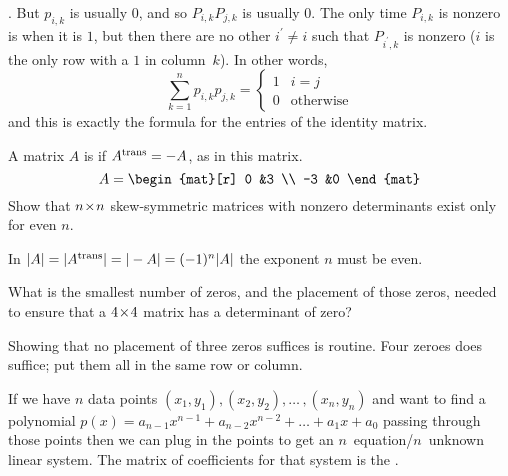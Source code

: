 \begin{exercises}
\begin{answer}
      \).
      But $p_{i,k}$ is usually $0$, and so $P_{i,k}P_{j,k}$ is usually $0$. 
      The only time $P_{i,k}$ is nonzero is when it is $1$, 
      but then there are no other $i^\prime\neq i$ such that $P_{i^\prime,k}$ 
      is nonzero ($i$ is the only row with a $1$ in column~$k$). 
      In other words,
      \begin{equation*}
        \sum_{k=1}^n p_{i,k}p_{j,k}=
        \begin{cases}
          1  &i=j  \\
          0  &\text{otherwise}
        \end{cases}
      \end{equation*}
      and this is exactly the formula for the entries of the identity matrix.
    \end{answer}
  \item 
    A matrix \( A \) is 
     if \( {{A}^{\rm trans}}=-A \),
    as in this matrix.
    \begin{equation*}
      A=\begin{mat}[r]
          0  &3  \\
         -3  &0
        \end{mat}
    \end{equation*}
    Show that \( n \! \times \! n \) skew-symmetric matrices with nonzero
    determinants exist only for even \( n \).
    \begin{answer}
      In 
      \( \deter{A}=\deter{\trans{A}}=\deter{-A}=(-1)^n\deter{A} \)
      the exponent $n$ must be even. 
    \end{answer}
  \recommended \item
    What is the smallest number of zeros, and the placement of
    those zeros, needed to ensure that a \( 4 \! \times \! 4 \) matrix has a
    determinant of zero?
    \begin{answer}
      Showing that no placement of three zeros suffices is routine.
      Four zeroes does suffice; put them all in the same  
      row or column.
    \end{answer}
  \recommended \item
    If we have \( n \) data points
    \( (x_1,y_1),(x_2,y_2),\dots\,,(x_n,y_n) \) and want to find a
    polynomial \( p(x)=a_{n-1}x^{n-1}+a_{n-2}x^{n-2}+\dots+a_1x+a_0 \)
    passing through those points
    then we can plug in the points to get an \( n \)~equation/\( n \)~unknown
    linear system.
    The matrix of coefficients for that system is the
    .%

\end{exercises}

